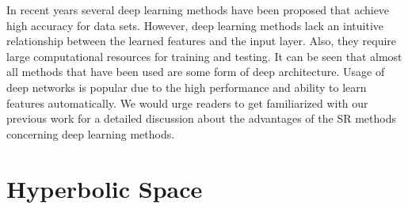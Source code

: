 In recent years several deep learning methods have been proposed that achieve high accuracy for data sets. However, deep learning methods lack an intuitive relationship between the learned features and the input layer. Also, they require large computational resources for training and testing. It can be seen that almost all methods that have been used are some form of deep architecture. Usage of deep networks is popular due to the high performance and ability to learn features automatically\cite{Li2019}. We would urge readers to get familiarized with our previous work\cite{Liyanage2020} for a detailed discussion about the advantages of the SR methods concerning deep learning methods.

\section{Hyperbolic Space}